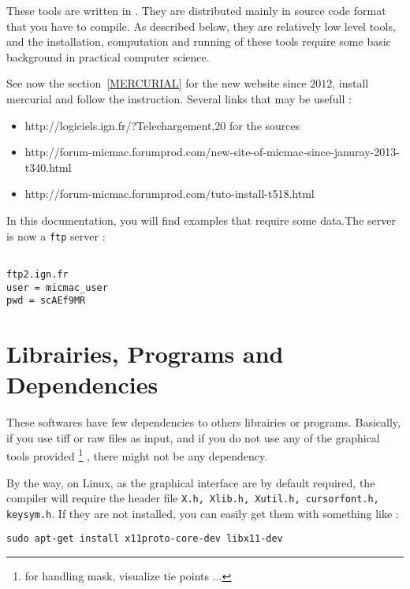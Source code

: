 \label{Install}
These tools are written in \CPP. They are distributed mainly in source code
format that you have to compile. As described below, they are relatively
low level tools, and the installation, computation and running of these
tools require some basic background in practical computer science.

See now the section~\ref{MERCURIAL} for the new website since $2012$, install mercurial and follow the instruction.
Several links that may be usefull :

\begin{itemize}
   \item http://logiciels.ign.fr/?Telechargement,20   for the sources
   \item http://forum-micmac.forumprod.com/new-site-of-micmac-since-januray-2013-t340.html
   \item http://forum-micmac.forumprod.com/tuto-install-t518.html
\end{itemize}


In this documentation, you will find examples that require some
data.The server is now a {\tt ftp} server :

\begin{verbatim}

ftp2.ign.fr
user = micmac_user
pwd = scAEf9MR

\end{verbatim}





\section{Librairies, Programs and Dependencies}

These softwares have few dependencies to others librairies or programs. Basically,
if you use tiff or raw files as input, and if you do not use any of the graphical
tools provided \footnote{for handling mask, visualize tie points ...} ,
there might not be any dependency.

By the way, on Linux, as the graphical interface are by default required, the compiler
will require the header file {\tt X.h, Xlib.h, Xutil.h, cursorfont.h, keysym.h}.
If they are not installed, you can easily get them  with something like :


\begin{verbatim}
sudo apt-get install x11proto-core-dev libx11-dev
\end{verbatim}

